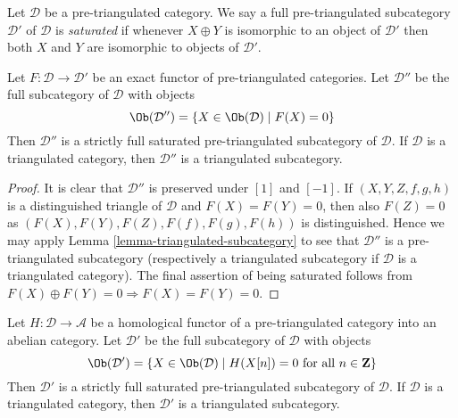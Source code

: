 \begin{definition}
\label{definition-saturated}
Let $\mathcal{D}$ be a pre-triangulated category. We say a full
pre-triangulated subcategory $\mathcal{D}'$ of $\mathcal{D}$ is
{\it saturated} if whenever $X \oplus Y$ is isomorphic to an object
of $\mathcal{D}'$ then both $X$ and $Y$ are isomorphic to objects
of $\mathcal{D}'$.
\end{definition}

\begin{lemma}
\label{lemma-triangle-functor-kernel}
Let $F : \mathcal{D} \to \mathcal{D}'$ be an exact functor of
pre-triangulated categories. Let $\mathcal{D}''$ be the full subcategory
of $\mathcal{D}$ with objects
$$
\Ob(\mathcal{D}'') =
\{X \in \Ob(\mathcal{D}) \mid F(X) = 0\}
$$
Then $\mathcal{D}''$ is a strictly full saturated pre-triangulated
subcategory of $\mathcal{D}$. If $\mathcal{D}$ is a triangulated category,
then $\mathcal{D}''$ is a triangulated subcategory.
\end{lemma}

\begin{proof}
It is clear that $\mathcal{D}''$ is preserved under $[1]$ and $[-1]$.
If $(X, Y, Z, f, g, h)$ is a distinguished triangle of $\mathcal{D}$
and $F(X) = F(Y) = 0$, then also $F(Z) = 0$ as
$(F(X), F(Y), F(Z), F(f), F(g), F(h))$ is distinguished.
Hence we may apply
Lemma \ref{lemma-triangulated-subcategory}
to see that $\mathcal{D}''$ is a pre-triangulated subcategory (respectively
a triangulated subcategory if $\mathcal{D}$ is a triangulated category).
The final assertion of being saturated follows from
$F(X) \oplus F(Y) = 0 \Rightarrow F(X) = F(Y) = 0$.
\end{proof}

\begin{lemma}
\label{lemma-homological-functor-kernel}
Let $H : \mathcal{D} \to \mathcal{A}$ be a homological functor of
a pre-triangulated category into an abelian category.
Let $\mathcal{D}'$ be the full subcategory of $\mathcal{D}$ with objects
$$
\Ob(\mathcal{D}') =
\{X \in \Ob(\mathcal{D}) \mid
H(X[n]) = 0\text{ for all }n \in \mathbf{Z}\}
$$
Then $\mathcal{D}'$ is a strictly full saturated pre-triangulated subcategory
of $\mathcal{D}$. If $\mathcal{D}$ is a triangulated category, then
$\mathcal{D}'$ is a triangulated subcategory.
\end{lemma}

